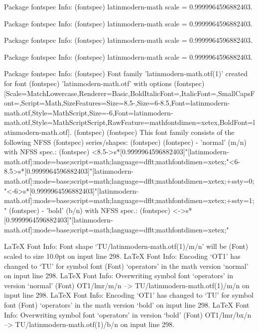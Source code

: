 Package fontspec Info: 
(fontspec)             latinmodern-math scale = 0.9999964596882403.


Package fontspec Info: 
(fontspec)             latinmodern-math scale = 0.9999964596882403.


Package fontspec Info: 
(fontspec)             latinmodern-math scale = 0.9999964596882403.


Package fontspec Info: 
(fontspec)             latinmodern-math scale = 0.9999964596882403.


Package fontspec Info: 
(fontspec)             Font family 'latinmodern-math.otf(1)' created for font
(fontspec)             'latinmodern-math.otf' with options
(fontspec)             [Scale=MatchLowercase,Renderer=Basic,BoldItalicFont={},ItalicFont={},SmallCapsFont={},Script=Math,SizeFeatures={{Size=8.5-},{Size=6-8.5,Font=latinmodern-math.otf,Style=MathScript},{Size=-6,Font=latinmodern-math.otf,Style=MathScriptScript}},RawFeature={mathfontdimen=xetex},BoldFont={latinmodern-math.otf}].
(fontspec)              
(fontspec)              This font family consists of the following NFSS
(fontspec)             series/shapes:
(fontspec)              
(fontspec)             - 'normal' (m/n) with NFSS spec.:
(fontspec)             <8.5->s*[0.9999964596882403]"[latinmodern-math.otf]:mode=base;script=math;language=dflt;mathfontdimen=xetex;"<6-8.5>s*[0.9999964596882403]"[latinmodern-math.otf]:mode=base;script=math;language=dflt;mathfontdimen=xetex;+ssty=0;"<-6>s*[0.9999964596882403]"[latinmodern-math.otf]:mode=base;script=math;language=dflt;mathfontdimen=xetex;+ssty=1;"
(fontspec)             - 'bold' (b/n) with NFSS spec.:
(fontspec)             <->s*[0.9999964596882403]"[latinmodern-math.otf]:mode=base;script=math;language=dflt;mathfontdimen=xetex;"

LaTeX Font Info:    Font shape `TU/latinmodern-math.otf(1)/m/n' will be
(Font)              scaled to size 10.0pt on input line 298.
LaTeX Font Info:    Encoding `OT1' has changed to `TU' for symbol font
(Font)              `operators' in the math version `normal' on input line 298.
LaTeX Font Info:    Overwriting symbol font `operators' in version `normal'
(Font)                  OT1/lmr/m/n --> TU/latinmodern-math.otf(1)/m/n on input line 298.
LaTeX Font Info:    Encoding `OT1' has changed to `TU' for symbol font
(Font)              `operators' in the math version `bold' on input line 298.
LaTeX Font Info:    Overwriting symbol font `operators' in version `bold'
(Font)                  OT1/lmr/bx/n --> TU/latinmodern-math.otf(1)/b/n on input line 298.

